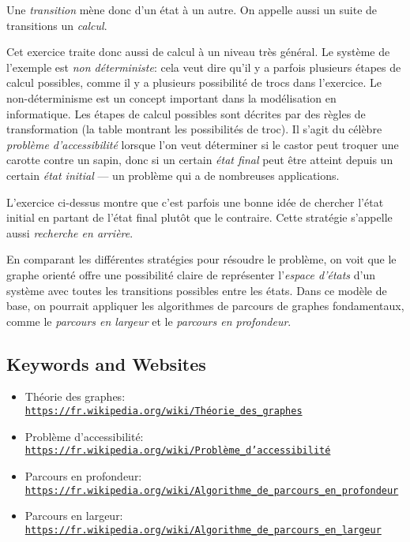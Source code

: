 \documentclass[a4paper,11pt]{report}
\newcommand{\BrochureUrlText}[1]{\texttt{#1}}
\begin{document}
Une \emph{transition} mène donc d’un état à un autre. On appelle aussi un suite de transitions un \emph{calcul}.

Cet exercice traite donc aussi de calcul à un niveau très général. Le système de l’exemple est \emph{non déterministe}: cela veut dire qu’il y a parfois plusieurs étapes de calcul possibles, comme il y a plusieurs possibilité de trocs dans l’exercice. Le non-déterminisme est un concept important dans la modélisation en informatique. Les étapes de calcul possibles sont décrites par des règles de transformation (la table montrant les possibilités de troc). Il s’agit du célèbre \emph{problème d’accessibilité} lorsque l’on veut déterminer si le castor peut troquer une carotte contre un sapin, donc si un certain \emph{état final} peut être atteint depuis un certain \emph{état initial} — un problème qui a de nombreuses applications.

L’exercice ci-dessus montre que c’est parfois une bonne idée de chercher l’état initial en partant de l’état final plutôt que le contraire. Cette stratégie s’appelle aussi \emph{recherche en arrière}.

En comparant les différentes stratégies pour résoudre le problème, on voit que le graphe orienté offre une possibilité claire de représenter l’\emph{espace d’états} d’un système avec toutes les transitions possibles entre les états. Dans ce modèle de base, on pourrait appliquer les algorithmes de parcours de graphes fondamentaux, comme le \emph{parcours en largeur} et le \emph{parcours en profondeur}.

{\raggedright

\subsection*{Keywords and Websites}

\begin{itemize}
  \item Théorie des graphes: \href{https://fr.wikipedia.org/wiki/Th\%C3\%A9orie_des_graphes}{\BrochureUrlText{https://fr.wikipedia.org/wiki/Théorie\_des\_graphes}}
  \item Problème d’accessibilité: \href{https://fr.wikipedia.org/wiki/Probl\%C3\%A8me_d\%27accessibilit\%C3\%A9}{\BrochureUrlText{https://fr.wikipedia.org/wiki/Problème\_d'accessibilité}}
  \item Parcours en profondeur: \href{https://fr.wikipedia.org/wiki/Algorithme_de_parcours_en_profondeur}{\BrochureUrlText{https://fr.wikipedia.org/wiki/Algorithme\_de\_parcours\_en\_profondeur}}
  \item Parcours en largeur: \href{https://fr.wikipedia.org/wiki/Algorithme_de_parcours_en_largeur}{\BrochureUrlText{https://fr.wikipedia.org/wiki/Algorithme\_de\_parcours\_en\_largeur}}
\end{itemize}


}
\end{document}
